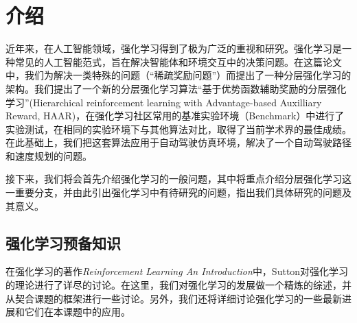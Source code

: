 \chapter{介绍}
近年来，在人工智能领域，强化学习得到了极为广泛的重视和研究。强化学习是一种常见的人工智能范式，旨在解决智能体和环境交互中的决策问题。在这篇论文中，我们为解决一类特殊的问题（``稀疏奖励问题''）而提出了一种分层强化学习的架构。我们提出了一个新的分层强化学习算法``基于优势函数辅助奖励的分层强化学习''(Hierarchical reinforcement learning with Advantage-based Auxilliary Reward, HAAR)，在强化学习社区常用的基准实验环境（Benchmark\cite{benchmarking_RL}）中进行了实验测试，在相同的实验环境下与其他算法对比，取得了当前学术界的最佳成绩。在此基础上，我们把这套算法应用于自动驾驶仿真环境，解决了一个自动驾驶路径和速度规划的问题。

接下来，我们将会首先介绍强化学习的一般问题，其中将重点介绍分层强化学习这一重要分支，并由此引出强化学习中有待研究的问题，指出我们具体研究的问题及其意义。

\section{强化学习预备知识}
  在强化学习的著作\textit{Reinforcement Learning An Introduction}\cite{Sutton_book}中，Sutton对强化学习的理论进行了详尽的讨论。在这里，我们对强化学习的发展做一个精炼的综述，并从契合课题的框架进行一些讨论。另外，我们还将详细讨论强化学习的一些最新进展和它们在本课题中的应用。
